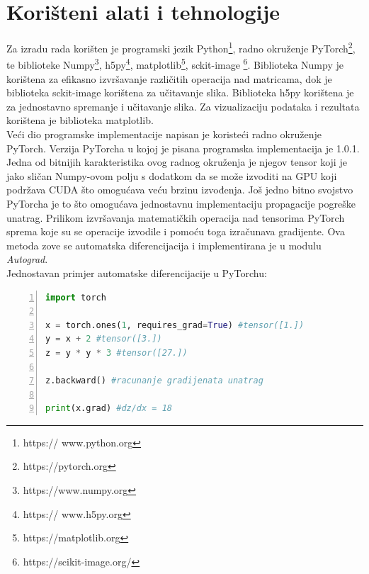 \documentclass[times, utf8, zavrsni, numeric]{fer}
\begin{document}
\section{Korišteni alati i tehnologije}
Za izradu rada korišten je programski jezik Python\footnote{https://
www.python.org}, radno okruženje PyTorch\footnote{https://pytorch.org},
te biblioteke Numpy\footnote{https://www.numpy.org}, h5py\footnote{https://
www.h5py.org}, matplotlib\footnote{https://matplotlib.org}, sckit-image
\footnote{https://scikit-image.org/}. Biblioteka Numpy je korištena za efikasno 
izvršavanje različitih operacija nad matricama, dok je biblioteka sckit-image 
korištena za učitavanje slika. 
Biblioteka h5py korištena je za jednostavno spremanje i učitavanje slika.
Za vizualizaciju podataka i rezultata korištena je biblioteka matplotlib.
\\\indent Veći dio programske implementacije napisan je koristeći radno
okruženje PyTorch. Verzija PyTorcha u kojoj je pisana programska implementacija
je 1.0.1. Jedna od bitnijih karakteristika ovog radnog okruženja je njegov
tensor koji je jako sličan Numpy-ovom polju s dodatkom da se
može izvoditi na GPU koji podržava CUDA što omogućava veću brzinu izvođenja.
Još jedno bitno svojstvo PyTorcha je to što omogućava jednostavnu implementaciju
propagacije pogreške unatrag. Prilikom izvršavanja matematičkih operacija 
nad tensorima PyTorch sprema koje su se operacije izvodile i pomoću toga
izračunava gradijente. Ova metoda zove se automatska diferencijacija i 
implementirana je u modulu \textit{Autograd}.
\\\indent Jednostavan primjer automatske diferencijacije u PyTorchu:
\begin{lstlisting}[numbers=left, language=Python, frame=single]
import torch

x = torch.ones(1, requires_grad=True) #tensor([1.])
y = x + 2 #tensor([3.])
z = y * y * 3 #tensor([27.])

z.backward() #racunanje gradijenata unatrag

print(x.grad) #dz/dx = 18 

\end{lstlisting}
\end{document}
